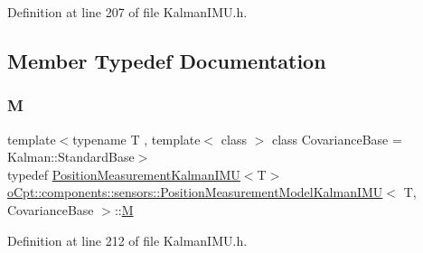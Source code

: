 Definition at line 207 of file Kalman\+I\+M\+U.\+h.



\subsection{Member Typedef Documentation}
\hypertarget{classo_cpt_1_1components_1_1sensors_1_1_position_measurement_model_kalman_i_m_u_a8bf21cd63d26386aba33fd39299f96bf}{}\label{classo_cpt_1_1components_1_1sensors_1_1_position_measurement_model_kalman_i_m_u_a8bf21cd63d26386aba33fd39299f96bf} 
\subsubsection{\texorpdfstring{M}{M}}
{\footnotesize\ttfamily template$<$typename T , template$<$ class $>$ class Covariance\+Base = Kalman\+::\+Standard\+Base$>$ \\
typedef \hyperlink{classo_cpt_1_1components_1_1sensors_1_1_position_measurement_kalman_i_m_u}{Position\+Measurement\+Kalman\+I\+MU}$<$T$>$ \hyperlink{classo_cpt_1_1components_1_1sensors_1_1_position_measurement_model_kalman_i_m_u}{o\+Cpt\+::components\+::sensors\+::\+Position\+Measurement\+Model\+Kalman\+I\+MU}$<$ T, Covariance\+Base $>$\+::\hyperlink{classo_cpt_1_1components_1_1sensors_1_1_position_measurement_model_kalman_i_m_u_a8bf21cd63d26386aba33fd39299f96bf}{M}}



Definition at line 212 of file Kalman\+I\+M\+U.\+h.

\hypertarget{classo_cpt_1_1components_1_1sensors_1_1_position_measurement_model_kalman_i_m_u_a79b139fdb8d4569de9b5082297c3397f}{}\label{classo_cpt_1_1components_1_1sensors_1_1_position_measurement_model_kalman_i_m_u_a79b139fdb8d4569de9b5082297c3397f} 
